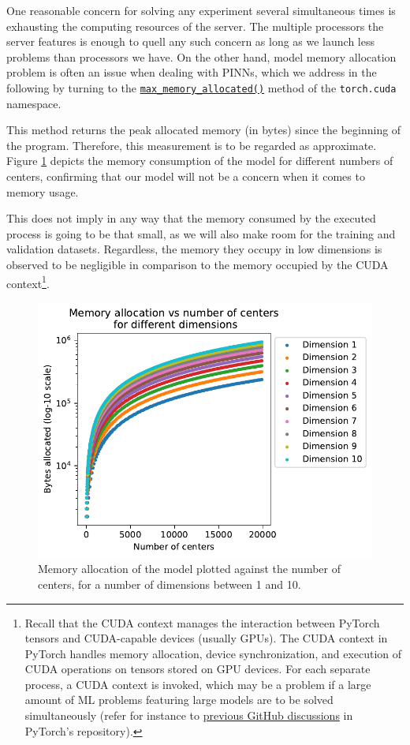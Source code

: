\documentclass[12pt]{report} %
\begin{document}
One reasonable concern for solving any experiment several simultaneous times is exhausting the computing resources of the server. The multiple processors the server features is enough to quell any such concern as long as we launch less problems than processors we have. On the other hand, model memory allocation problem is often an issue when dealing with PINNs, which we address in the following by turning to the \href{https://pytorch.org/docs/stable/generated/torch.cuda.max_memory_allocated.html}{\texttt{max\_memory\_allocated()}}
method of the \texttt{torch.cuda} namespace. 

This method returns the peak allocated memory (in bytes) since the beginning of the program. Therefore, this
measurement is to be regarded as approximate. Figure \ref{fig:model-consumption-memory} depicts the memory consumption of the
model for different numbers of centers, confirming that our model will not be a concern when it comes to memory usage. 

This does not imply in any way that the memory consumed by the executed process is going to be that small, as we will also make room for the training and validation datasets. Regardless, the memory they occupy in low dimensions is observed to be negligible in comparison to the memory occupied by the CUDA context\footnote{Recall that the CUDA context manages the interaction between PyTorch tensors and CUDA-capable devices (usually GPUs). The CUDA context in PyTorch handles memory allocation, device synchronization, and execution of CUDA operations on tensors stored on GPU devices. For each separate process, a CUDA context is invoked, which may be a problem if a large amount of ML problems featuring large models are to be solved simultaneously  (refer for instance to \href{https://github.com/pytorch/pytorch/issues/20532}{previous GitHub discussions} in PyTorch's repository).}.


\begin{figure}[ht]
  \includegraphics[width=.7\textwidth]{imagenes/model_consumption/Memory_allocation_vs_number_of_centers.pdf}
  \caption{Memory allocation of the model plotted against the number of centers, for
    a number of dimensions between 1 and 10.}
  \label{fig:model-consumption-memory}
\end{figure}
\end{document}
